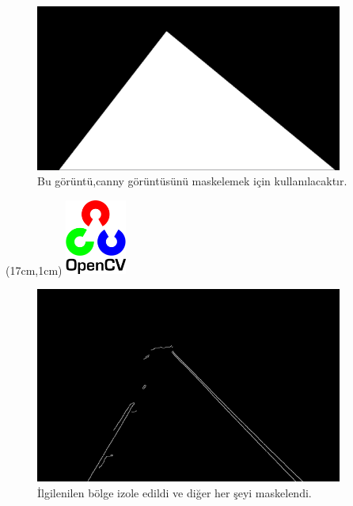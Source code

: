 \documentclass{article}
\begin{document}
\begin{figure}[h]
  \centering
  \includegraphics[width=0.9\textwidth]{image/Resim27.png} %
  \caption{Bu görüntü,canny görüntüsünü maskelemek için kullanılacaktır.}
  \label{fig:python25}  
\end{figure}
\newpage
\begin{textblock*}{5cm}(17cm,1cm) %
    \includegraphics[width=2cm]{image/Resim17.png} %
\end{textblock*}
\begin{figure}[h]
  \centering
  \includegraphics[width=0.9\textwidth]{image/Resim28.png} %
  \caption{İlgilenilen bölge izole edildi ve diğer her şeyi maskelendi.}
  \label{fig:python26}  
\end{figure}
\end{document}
